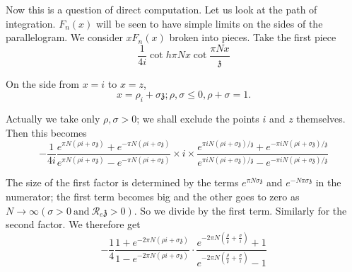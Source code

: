 \noindent 
\begin{minipage}[c]{4.5cm}
  Now this is a question of direct computation. Let us
  look at the path of integration. $F_n(x)$ will be seen to have simple
  limits on the sides of the parallelogram. We consider $xF_n (x)$
  broken into pieces. Take the first piece
  $$
  \frac{1}{4 i} \cot h \pi N x \cot \frac{\pi N x}{\mathfrak{z}}
  $$
  
  On the side from $x=i$ to $x=z$, 
  $$
  x= \rho_i + \sigma \mathfrak{z}; \rho, \sigma \leq 0, \rho+ \sigma=1. 
  $$
\end{minipage}
\begin{minipage}[c]{5.5cm}
  \begin{figure}[H]
  \end{figure}
\end{minipage}
\medskip

Actually we take only $\rho, \sigma > 0$; we shall exclude the points
$i$ and $z$ themselves. Then this becomes
$$
- \frac{1}{4 i} \frac{e^{\pi N (\rho i + \sigma \mathfrak{z})}+ e^{-
    \pi N (\rho i + \sigma \mathfrak{z})}}{e^{ \pi N(\rho i + \sigma
    \mathfrak{z})}- e^{- \pi N (\rho i + \sigma \mathfrak{z})}} \times
i \times \frac{e^{ \pi i N (\rho i + \sigma
    \mathfrak{z})/\mathfrak{z}} + e^{- \pi i N ( \rho i + \sigma
    \mathfrak{z})/\mathfrak{z}}}{e^{\pi i N (\rho i + \sigma
    \mathfrak{z})/\mathfrak{z}}- e^{- \pi i N (\rho i + \sigma
    \mathfrak{z})/\mathfrak{z}}} 
$$

The size of the first factor is determined by the terms $e^{\pi N
  \sigma \mathfrak{z}}$ and $e^{- N \pi \sigma \mathfrak{z}}$ in the
numerator; the first term becomes big and the other goes to zero as $N
\to \infty (\sigma > 0~\text{and}~ \mathcal{R}_e \mathfrak{z}> 0)$. So
we divide by the first term. Similarly for the second factor. We
therefore get
$$
- \frac{1}{4} \frac{1+ e^{-2 \pi N (\rho i + \sigma \mathfrak{z})}}{1-
  e^{-2 \pi N (\rho i + \sigma \mathfrak{z})}} \cdot \frac{e^{- 2 \pi
    N \left(\frac{\rho}{\mathfrak{z}} + \frac{\sigma}{i}
    \right)}+ 1}{e^{- 2 \pi N \left( \frac{\rho}{\mathfrak{z}} +
    \frac{\sigma}{i}\right)}-1} 
$$\pageoriginale


